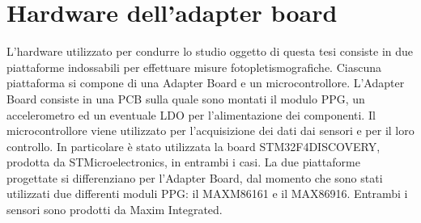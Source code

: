 \section{Hardware dell'adapter board}
L'hardware utilizzato per condurre lo studio oggetto di questa tesi consiste in due piattaforme indossabili per effettuare misure fotopletismografiche. Ciascuna piattaforma si compone di una Adapter Board e un microcontrollore. L'Adapter Board consiste in una PCB sulla quale sono montati il modulo PPG, un accelerometro ed un eventuale LDO per l'alimentazione dei componenti. Il microcontrollore viene utilizzato per l'acquisizione dei dati dai sensori e per il loro controllo. In particolare è stato utilizzata la board STM32F4DISCOVERY, prodotta da STMicroelectronics, in entrambi i casi.
La due piattaforme progettate si differenziano per l'Adapter Board, dal momento che sono stati utilizzati due differenti moduli PPG: il MAXM86161 e il MAX86916. Entrambi i sensori sono prodotti da Maxim Integrated.
